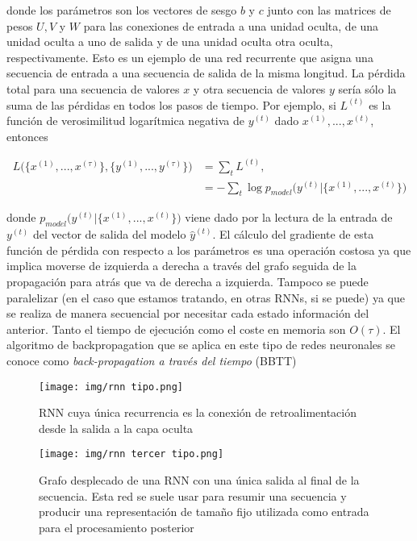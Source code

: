         \noindent donde los parámetros son los vectores de sesgo $b$ y $c$ junto con las matrices de pesos $U, V$ y $W$ para las conexiones de entrada a una unidad oculta, de una unidad oculta a uno de salida y de una unidad oculta otra oculta, respectivamente. Esto es un ejemplo de una red recurrente que asigna una secuencia de entrada a una secuencia de salida de la misma longitud. La pérdida total para una secuencia de valores $x$ y otra secuencia de valores $y$ sería sólo la suma de las pérdidas en todos los pasos de tiempo. Por ejemplo, si $L^{(t)}$ es la función de verosimilitud logarítmica negativa de $y^{(t)}$ dado $x^{(1)},...,x^{(t)}$, entonces
        
            \begin{align}
               L \big( \{x^{(1)},...,x^{(\tau)}\},\{y^{(1)},...,y^{(\tau)}\} \big) &= \sum_{t} L^{(t)}, \\
                &= -\sum_{t} \log p_{model} \big( y^{(t)} | \{x^{(1)},...,x^{(t)}\} \big)
            \end{align}  
        
        \noindent donde $p_{model} \big( y^{(t)} | \{x^{(1)},...,x^{(t)}\} \big)$ viene dado por la lectura de la entrada de $y^{(t)}$ del vector de salida del modelo  $\hat{y}^{(t)}$. El cálculo del gradiente de esta función de pérdida con respecto a los parámetros es una operación costosa ya que implica moverse de izquierda a derecha a través del grafo seguida de la propagación para atrás que va de derecha a izquierda. Tampoco se puede paralelizar (en el caso que estamos tratando, en otras RNNs, si se puede) ya que se realiza de manera secuencial por necesitar cada estado información del anterior. Tanto el tiempo de ejecución como el coste en memoria son $O(\tau)$. El algoritmo de backpropagation que se aplica en este tipo de redes neuronales se conoce como \textit{back-propagation a través del tiempo} (BBTT)\\ 
        
        \begin{figure}[htpb]
            \centering
            \texttt{[image: img/rnn tipo.png]}
            \caption{RNN cuya única recurrencia es la conexión de retroalimentación desde la salida a la capa oculta}
            \label{fig:rnn2tipo}
        \end{figure}
        
        
        
        \begin{figure}[htpb]
            \centering
            \texttt{[image: img/rnn tercer tipo.png]}
            \caption{Grafo desplecado de una RNN con una única salida al final de la secuencia. Esta red se suele usar para resumir una secuencia y producir una representación de tamaño fijo utilizada como entrada para el procesamiento posterior}
            \label{fig:rnn3tipo}
        \end{figure}
        
